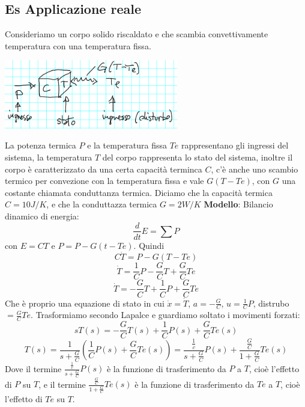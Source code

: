 \subsection{Es Applicazione reale}
Consideriamo un corpo solido riscaldato e che scambia convettivamente temperatura con una temperatura fissa.
\begin{center}
    \includegraphics[height=3cm]{../lezione7/img1.PNG}
\end{center}
La potenza termica $P$ e la temperatura fissa $Te$ rappresentano gli ingressi del sistema, la temperatura $T$ del corpo rappresenta lo stato del sistema, inoltre il corpo è caratterizzato da una certa capacità terminca $C$, c'è anche uno scambio termico per convezione con la temperatura fissa e vale $G(T-Te)$, con $G$ una costante chiamata conduttanza termica.\newline
Diciamo che la capacità termica $C=10J/K$, e che la conduttazza termica $G = 2 W/K$
\newline
\newline
\textbf{Modello}:\newline
Bilancio dinamico di energia:
\[
    \frac{d}{dt}E = \sum P
\] con $E = CT$ e $P = P-G(t-Te)$. \newline
Quindi
\[
    C \dot{T} = P - G(T-Te)
\]
\[
    \dot{T} = \frac{1}{C}P - \frac{G}{C} T + \frac{G}{C}Te
\]
\[
    \dot{T} = -\frac{G}{C}T + \frac{1}{C}P + \frac{G}{C}Te
\]
Che è proprio una equazione di stato in cui $\dot{x} = \dot{T}$, $a=-\frac{G}{C}$, $u=\frac{1}{C}P$, distrubo$=\frac{G}{C}Te $.\newline
Trasformiamo secondo Lapalce e guardiamo soltato i movimenti forzati:
\[
    sT(s) = - \frac{G}{C}T(s) + \frac{1}{C}P(s) + \frac{G}{C}Te(s)
\]
\[
    T(s) = \frac{1}{s+ \frac{G}{C}}( \frac{1}{C}P(s) + \frac{G}{C}Te(s)) = \frac{\frac{1}{c}}{s + \frac{G}{C}} P(s) + \frac{\frac{G}{C}}{1 + \frac{G}{C}} Te(s)
\]
Dove il termine $\frac{\frac{1}{c}}{s + \frac{G}{C}} P(s)$ è la funzione di trasferimento da $P$ a $T$, cioè l'effetto di $P$ su $T$, e il termine $\frac{\frac{G}{C}}{1 + \frac{G}{C}} Te(s)$ è la funzione di trasferimento da $Te$ a $T$, cioè l'effetto di $Te$ su $T$.\newline
